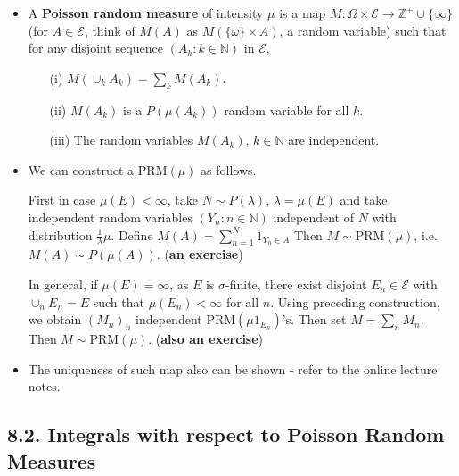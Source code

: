 \documentclass[12pt,a4paper]{report}
\begin{document}
\begin{itemize}
\item A \textbf{Poisson random measure} of intensity $\mu$ is a map $M : \Omega \times \mathscr{E} \rightarrow \mathbb{Z}^+ \cup \{\infty \}$ (for $A \in \mathscr{E}$, think of $M(A)$ as $M(\{\omega \} \times A)$, a random variable) such that for any disjoint sequence $(A_k : k\in \mathbb{N})$ in $\mathscr{E}$,
\begin{itemize}
\item[(i)] $M(\cup_k A_k) = \sum_k M(A_k)$. 
\item[(ii)] $M(A_k)$ is a $P(\mu(A_k))$ random variable for all $k$.
\item[(iii)] The random variables $M(A_k)$, $k\in \mathbb{N}$ are independent.
\end{itemize}
\item We can construct a $\text{PRM}(\mu)$ as follows.

\quad First in case $\mu(E) < \infty$, take $N\sim P(\lambda)$, $\lambda = \mu(E)$ and take independent random variables $(Y_n : n\in \mathbb{N})$ independent of $N$ with distribution $\frac{1}{\lambda} \mu$. Define $M(A) = \sum_{n=1}^{N} 1_{Y_n \in A}$ Then $M \sim \text{PRM}(\mu)$, i.e. $M(A) \sim P(\mu(A))$. (\textbf{an exercise})

\quad In general, if $\mu(E) = \infty$, as $E$ is $\sigma$-finite, there exist disjoint $E_n \in \mathscr{E}$ with $\cup_{n} E_{n} = E$ such that $\mu(E_n) < \infty$ for all $n$. Using preceding construction, we obtain $(M_n)_n$ independent $\text{PRM}(\mu 1_{E_n})$'s. Then set $M = \sum_n M_n$. Then $M \sim \text{PRM}(\mu)$. (\textbf{also an exercise})

\item The uniqueness of such map also can be shown - refer to the online lecture notes.
\end{itemize}

\subsection*{8.2. Integrals with respect to Poisson Random Measures}
\end{document}
